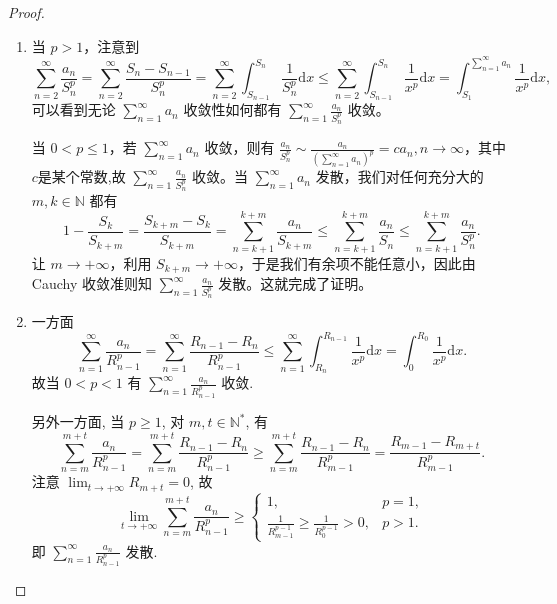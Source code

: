 \documentclass[../../main.tex]{subfiles}
\begin{document}
\begin{proof}
\begin{enumerate}
\item 当 \( p > 1 \)，注意到
\[
\sum_{n = 2}^{\infty} \frac{a_n}{S_n^p} = \sum_{n = 2}^{\infty} \frac{S_n - S_{n - 1}}{S_n^p} = \sum_{n = 2}^{\infty} \int_{S_{n - 1}}^{S_n} \frac{1}{S_n^p} \mathrm{d}x \leqslant \sum_{n = 2}^{\infty} \int_{S_{n - 1}}^{S_n} \frac{1}{x^p} \mathrm{d}x = \int_{S_1}^{\sum\limits_{n = 1}^{\infty} a_n} \frac{1}{x^p} \mathrm{d}x,
\]
可以看到无论 \( \sum_{n = 1}^{\infty} a_n \) 收敛性如何都有 \( \sum_{n = 1}^{\infty} \frac{a_n}{S_n^p} \) 收敛。

当 \( 0 < p \leqslant 1 \)，若 \( \sum_{n = 1}^{\infty} a_n \) 收敛，则有 \( \frac{a_n}{S_n^p} \sim \frac{a_n}{\left( \sum\limits_{n = 1}^{\infty} a_n \right)^p}=ca_n, n \to \infty \)，其中$c$是某个常数,故 \( \sum_{n = 1}^{\infty} \frac{a_n}{S_n^p} \) 收敛。当 \( \sum_{n = 1}^{\infty} a_n \) 发散，我们对任何充分大的 \( m, k \in \mathbb{N} \) 都有
\[
1 - \frac{S_k}{S_{k + m}} = \frac{S_{k + m} - S_k}{S_{k + m}} = \sum_{n = k + 1}^{k + m} \frac{a_n}{S_{k + m}} \leqslant \sum_{n = k + 1}^{k + m} \frac{a_n}{S_n} \leqslant \sum_{n = k + 1}^{k + m} \frac{a_n}{S_n^p}.
\]
让 \( m \to +\infty \)，利用 \( S_{k + m} \to +\infty \)，于是我们有余项不能任意小，因此由 Cauchy 收敛准则知 \( \sum_{n = 1}^{\infty} \frac{a_n}{S_n^p} \) 发散。这就完成了证明。

\item 一方面
\[
\sum_{n=1}^{\infty} \frac{a_n}{R_{n-1}^p} = \sum_{n=1}^{\infty} \frac{R_{n-1} - R_n}{R_{n-1}^p} \leqslant \sum_{n=1}^{\infty} \int_{R_n}^{R_{n-1}} \frac{1}{x^p} \mathrm{d}x = \int_{0}^{R_0} \frac{1}{x^p} \mathrm{d}x.
\]
故当 \( 0 < p < 1 \) 有 \( \sum_{n=1}^{\infty} \frac{a_n}{R_{n-1}^p} \) 收敛.

另外一方面, 当 \( p \geqslant 1 \), 对 \( m,t \in \mathbb{N}^* \), 有
\[
\sum_{n=m}^{m+t} \frac{a_n}{R_{n-1}^p} = \sum_{n=m}^{m+t} \frac{R_{n-1} - R_n}{R_{n-1}^p} \geqslant \sum_{n=m}^{m+t} \frac{R_{n-1} - R_n}{R_{m-1}^p} = \frac{R_{m-1} - R_{m+t}}{R_{m-1}^p}.
\]
注意 \( \lim_{t \to +\infty} R_{m+t} = 0 \), 故
\[
\lim_{t \to +\infty} \sum_{n=m}^{m+t} \frac{a_n}{R_{n-1}^p} \geqslant \begin{cases}
1, & p = 1, \\
\frac{1}{R_{m-1}^{p-1}} \geqslant \frac{1}{R_0^{p-1}} > 0, & p > 1.
\end{cases}
\]
即 \( \sum_{n=1}^{\infty} \frac{a_n}{R_{n-1}^p} \) 发散.
\end{enumerate}
\end{proof}
\end{document}

